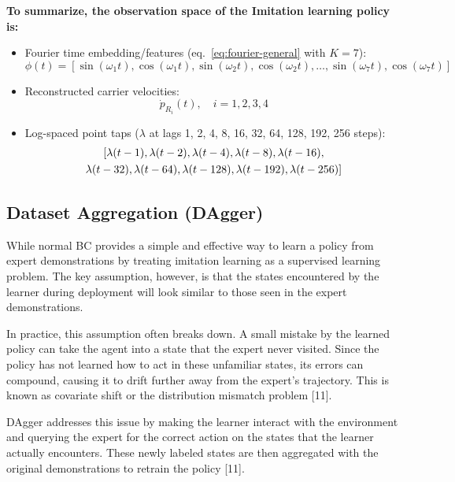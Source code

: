 
\noindent\textbf{To summarize, the observation space of the Imitation
learning policy is:}

\begin{itemize}
  \item Fourier time embedding/features (eq.~\eqref{eq:fourier-general}
  with $K=7$):
  \[
    \phi(t) = [\sin(\omega_1 t), \cos(\omega_1 t), \sin(\omega_2 t), \cos(\omega_2 t), \dots, \sin(\omega_7 t), \cos(\omega_7 t)]
  \]
  \item Reconstructed carrier velocities:
  \[
    \dot{p}_{R_i}(t), \quad i=1,2,3,4
  \]
  \item Log-spaced point taps ($\lambda$ at lags 1, 2, 4, 8, 16, 32, 64,
  128, 192, 256 steps):
  \[
  \begin{gathered}
    \relax[\lambda(t-1), \lambda(t-2), \lambda(t-4), \lambda(t-8), \lambda(t-16), \\
     \lambda(t-32), \lambda(t-64), \lambda(t-128), \lambda(t-192), \lambda(t-256)]
  \end{gathered}
  \]
\end{itemize}

\subsection{Dataset Aggregation (DAgger)}
\label{sec:dagger}

While normal BC provides a simple and effective way to learn a policy
from expert demonstrations by treating imitation learning as a
supervised learning problem. The key assumption, however, is that the
states encountered by the learner during deployment will look similar
to those seen in the expert demonstrations.

In practice, this assumption often breaks down. A small mistake by the
learned policy can take the agent into a state that the expert never
visited. Since the policy has not learned how to act in these
unfamiliar states, its errors can compound, causing it to drift further
away from the expert's trajectory. This is known as covariate shift or
the distribution mismatch problem [11].

DAgger addresses this issue by making the learner interact with the
environment and querying the expert for the correct action on the
states that the learner actually encounters. These newly labeled states
are then aggregated with the original demonstrations to retrain the
policy [11].

